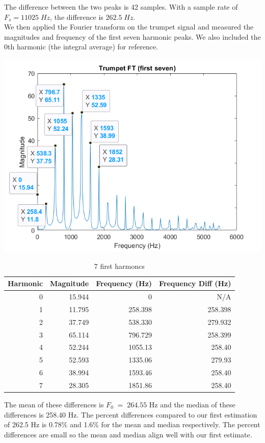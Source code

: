 \documentclass[11pt]{article}
\begin{document}
The difference between the two peaks is 42 samples.
With a sample rate of $F_s = 11025\;Hz$, the difference is $262.5\;Hz$.\\

We then applied the Fourier transform on the trumpet signal and measured the magnitudes and frequency of the first seven harmonic peaks.
We also included the 0th harmonic (the integral average) for reference.

\includegraphics[width=\textwidth]{trumpet_ft_first7.png}

\begin{table}[H]
	\centering
	\begin{tabular}{rrrr}\toprule
		Harmonic & Magnitude & Frequency (Hz) & Frequency Diff (Hz)\\\midrule
		0 & 15.944 & 0  & N/A \\
		1 & 11.795 & 258.398 & 258.398 \\
		2 & 37.749 & 538.330 & 279.932 \\
		3 & 65.114 & 796.729 & 258.399 \\
		4 & 52.244 & 1055.13 & 258.40 \\
		5 & 52.593 & 1335.06 & 279.93 \\
		6 & 38.994 & 1593.46 & 258.40 \\
		7 & 28.305 & 1851.86 & 258.40 \\\bottomrule
	\end{tabular}
	\caption{\label{tab:first-harmonics}7 first harmoncs}
\end{table}

The mean of these differences is $F_0 \; = \; 264.55$ Hz and the median of these differences is 258.40 Hz.
The percent differences compared to our first estimation of 262.5 Hz is 0.78\% and 1.6\% for the mean and median respectively.
The percent differences are small so the mean and median align well with our first estimate.\\
\end{document}
